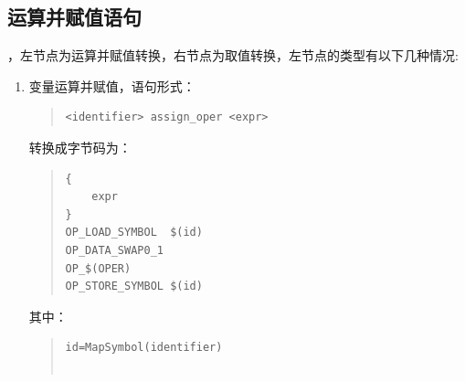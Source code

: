 \subsection{运算并赋值语句}
，左节点为运算并赋值转换，右节点为取值转换，左节点的类型有以下几种情况:
\begin{enumerate}
\item 变量运算并赋值，语句形式：
\begin{quote}
\begin{verbatim}
<identifier> assign_oper <expr>
\end{verbatim}
\end{quote}
转换成字节码为：
\begin{quote}
\begin{verbatim}
{
    expr 
}
OP_LOAD_SYMBOL  $(id)
OP_DATA_SWAP0_1
OP_$(OPER)
OP_STORE_SYMBOL $(id)
\end{verbatim}
\end{quote}
其中：
\begin{quote}
\begin{verbatim}
id=MapSymbol(identifier)


\end{verbatim}
\end{quote}
\end{enumerate}
